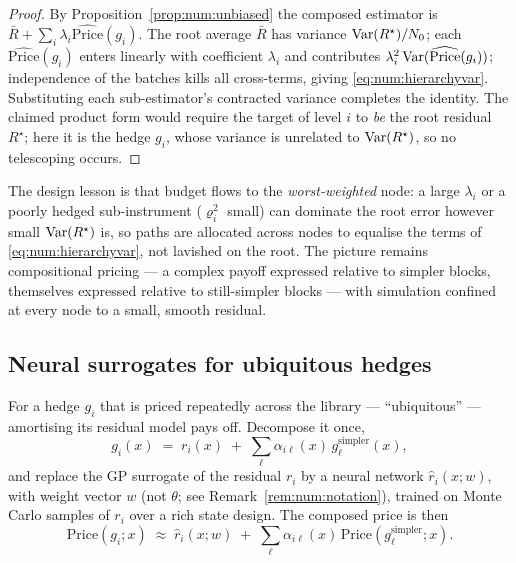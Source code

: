 \begin{proof}
By Proposition~\ref{prop:num:unbiased} the composed estimator is
$\bar R + \sum_i \lambda_i \widehat{\mathrm{Price}}(g_i)$. The root average $\bar R$ has
variance $\operatorname{Var}(R^\star)/N_0$; each $\widehat{\mathrm{Price}}(g_i)$ enters linearly with
coefficient $\lambda_i$ and contributes $\lambda_i^2\operatorname{Var}(\widehat{\mathrm{Price}}(g_i))$;
independence of the batches kills all cross-terms, giving
\eqref{eq:num:hierarchyvar}. Substituting each sub-estimator's contracted
variance completes the identity. The claimed product form would require the
target of level $i$ to \emph{be} the root residual $R^\star$; here it is the hedge
$g_i$, whose variance is unrelated to $\operatorname{Var}(R^\star)$, so no telescoping occurs.
\end{proof}

The design lesson is that budget flows to the \emph{worst-weighted} node: a large
$\lambda_i$ or a poorly hedged sub-instrument ($\varrho_i^2$ small) can dominate
the root error however small $\operatorname{Var}(R^\star)$ is, so paths are allocated across
nodes to equalise the terms of \eqref{eq:num:hierarchyvar}, not lavished on the
root. The picture remains compositional pricing --- a complex payoff expressed
relative to simpler blocks, themselves expressed relative to still-simpler blocks
--- with simulation confined at every node to a small, smooth residual.

\subsection{Neural surrogates for ubiquitous hedges}

For a hedge $g_i$ that is priced repeatedly across the library --- ``ubiquitous''
--- amortising its residual model pays off. Decompose it once,
\begin{equation}\label{eq:num:nndecomp}
   g_i(x) \;=\; r_i(x) \;+\; \sum_{\ell} \alpha_{i\ell}(x)\, g^{\mathrm{simpler}}_\ell(x),
\end{equation}
and replace the GP surrogate of the residual $r_i$ by a neural network
$\hat r_i(x; w)$, with weight vector $w$ (not $\theta$; see
Remark~\ref{rem:num:notation}), trained on Monte Carlo samples of $r_i$ over a
rich state design. The composed price is then
\begin{equation}\label{eq:num:nnprice}
   \mathrm{Price}(g_i; x) \;\approx\;
   \hat r_i(x; w) \;+\; \sum_\ell \alpha_{i\ell}(x)\,\mathrm{Price}(g^{\mathrm{simpler}}_\ell; x).
\end{equation}


